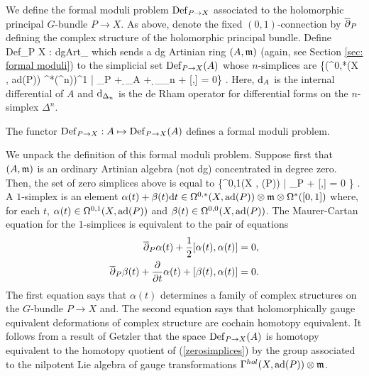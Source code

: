 We define the formal moduli problem ${\rm Def}_{P\to X}$ associated to the holomorphic principal $G$-bundle $P \to X$. 
As above, denote the fixed $(0,1)$-connection by $\overline{\partial}_P$ defining the complex structure of the holomorphic principal bundle. 
Define
\ben
{\rm Def}_{P \to X} : {\rm dgArt}_\CC {}
\een
which sends a dg Artinian ring $(A, {\mathfrak m})$ (again, see Section \ref{sec: formal moduli}) to the simplicial set ${\rm Def}_{P \to X}(A)$ whose $n$-simplices are
\ben
\left\{\alpha \in \left(\Omega^{0,*}(X , {\rm ad}(P)) \tensor \fm \tensor \Omega^*(\Delta^n)\right)^1  \;  | \; \dbar_P \alpha + \d_A \alpha + \d_{\Delta_n} \alpha +  [\alpha,\alpha] = 0\right\} .
\een
Here, ${\rm d}_A$ is the internal differential of $A$ and ${\rm d}_{\Delta_n}$ is the de Rham operator for differential forms on the $n$-simplex $\Delta^n$. 

\begin{lem}
The functor ${\rm Def}_{P \to X} : A \mapsto {\rm Def}_{P \to X}(A)$ defines a formal moduli problem.
\end{lem} 

We unpack the definition of this formal moduli problem.
Suppose first that $(A, {\mathfrak m})$ is an ordinary Artinian algebra (not dg) concentrated in degree zero. 
Then, the set of zero simplices above is equal to
\be\label{zerosimplices}
\{\alpha \in \Omega^{0,1}(X , \ad(P)) \tensor \fm \; | \; \dbar_P \alpha +  [\alpha,\alpha] = 0 \} .
\ee
A $1$-simplex is an element $\alpha(t) + \beta(t) {\rm d} t \in \Omega^{0,*}(X, {\rm ad}(P)) \otimes {\mathfrak m} \otimes \Omega^*([0,1])$ where, for each $t$, $\alpha(t) \in \Omega^{0,1}(X , {\rm ad}(P))$ and $\beta(t) \in \Omega^{0,0}(X, {\rm ad}(P))$.
The Maurer-Cartan equation for the $1$-simplices is equivalent to the pair of equations
\begin{align*}
\overline{\partial}_P \alpha(t) + \frac{1}{2}[\alpha(t), \alpha(t)] & = 0 ,\\
\overline{\partial}_P \beta(t) + \frac{\partial}{\partial t} \alpha(t) + [\beta(t), \alpha(t)] & = 0 .
\end{align*}
The first equation says that $\alpha(t)$ determines a family of complex structures on the $G$-bundle $P \to X$ and.
The second equation says that holomorphically gauge equivalent deformations of complex structure are cochain homotopy equivalent. 
It follows from a result of Getzler \cite{GetzlerLie} that the space ${\rm Def}_{P \to X}(A)$ is homotopy equivalent to the homotopy quotient of (\ref{zerosimplices}) by the group associated to the nilpotent Lie algebra of gauge transformations $\Gamma^{hol}(X, {\rm ad}(P)) \otimes {\mathfrak m}$. 

